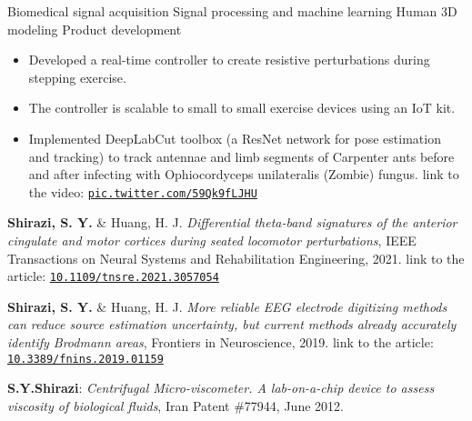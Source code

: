 \begin{outline}
    \1 Biomedical signal acquisition
    \1 Signal processing and machine learning
    \1 Human 3D modeling
    \1 Product development
    
\end{outline}

\begin{itemize}
\item Developed a real-time controller to create resistive perturbations during stepping exercise.
\item The controller is scalable to small to small exercise devices using an IoT kit.
\end{itemize}
\smallskip
{}
\begin{itemize}
\item Implemented DeepLabCut toolbox (a ResNet network for pose estimation and tracking) to track antennae and limb segments of Carpenter ants before and after infecting with Ophiocordyceps unilateralis (Zombie) fungus. {\footnotesize{link to the video:} {\tt{\href{https://pic.twitter.com/59Qk9fLJHU}{pic.twitter.com/59Qk9fLJHU}}}}
\end{itemize}

\smallskip
\textbf{Shirazi, S. Y.} \& Huang, H. J. \textit{Differential theta-band signatures of the anterior cingulate and motor cortices during seated locomotor perturbations}, IEEE Transactions on Neural Systems and Rehabilitation Engineering, 2021. {\footnotesize{link to the article:} {\tt{\href{https://ieeexplore.ieee.org/document/9347561}{10.1109/tnsre.2021.3057054}}}}
\smallskip
\vspace{1ex}

\textbf{Shirazi, S. Y.} \& Huang, H. J. \textit{More reliable EEG electrode digitizing methods can reduce source estimation uncertainty, but current methods already accurately identify Brodmann areas}, Frontiers in Neuroscience, 2019. {\footnotesize{link to the article:} {\tt{\href{https://www.frontiersin.org/articles/10.3389/fnins.2019.01159/}{10.3389/fnins.2019.01159}}}}

\textbf{S.Y.Shirazi}: \textit{Centrifugal Micro-viscometer. A lab-on-a-chip device to assess viscosity of biological fluids}, Iran Patent \#77944, June 2012.
